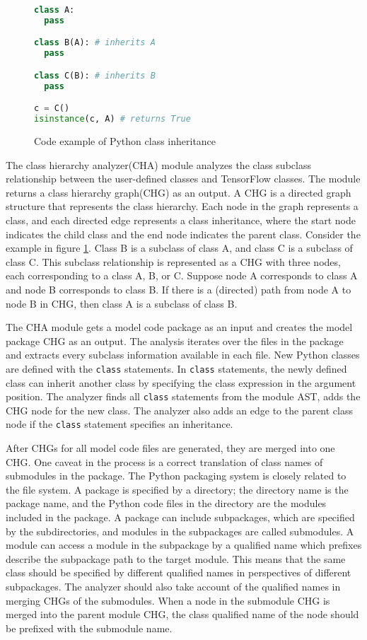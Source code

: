 \begin{figure}[h]
\begin{lstlisting}[language=Python]
class A:
  pass

class B(A): # inherits A
  pass

class C(B): # inherits B
  pass

c = C()
isinstance(c, A) # returns True
\end{lstlisting}
\caption{Code example of Python class inheritance}
\label{fig:cha:pythonex}
\end{figure}

The class hierarchy analyzer(CHA) module analyzes the
class subclass relationship between the 
user-defined classes and TensorFlow classes.
The module returns a class hierarchy graph(CHG) as an output.
A CHG is a directed graph structure that represents the class hierarchy.
Each node in the graph represents a class,
and each directed edge represents a class inheritance,
where the start node indicates the child class
and the end node indicates the parent class.
Consider the example in figure \ref{fig:cha:pythonex}.
Class B is a subclass of class A, and class C is a subclass of 
class C.
This subclass relationship is represented as a CHG with three nodes,
each corresponding to a class A, B, or C.
Suppose node A corresponds to class A and node B corresponds to
class B.
If there is a (directed) path from node A to node B in CHG,
then class A is a subclass of class B.

The CHA module gets a model code package as an input
and creates the model package CHG as an output.
The analysis iterates over the files in the package
and extracts every subclass information available in each file.
New Python classes are defined with the {\tt class} statements.
In {\tt class} statements, the newly defined class can
inherit another class by specifying the class expression
in the argument position.
The analyzer finds all {\tt class} statements from the module AST,
adds the CHG node for the new class. The analyzer also adds an edge
to the parent class node if the {\tt class} statement specifies an inheritance.

After CHGs for all model code files are generated, 
they are merged into one CHG.
One caveat in the process is a correct translation of class names
of submodules in the package.
The Python packaging system is closely related to the file system.
A package is specified by a directory; 
the directory name is the package name, 
and the Python code files in the directory are the modules included in the package.
A package can include subpackages, which are specified
by the subdirectories, and modules in the subpackages are called submodules.
A module can access a module in the subpackage by a qualified name
which prefixes describe the subpackage path to the target module.
This means that the same class should be specified by different qualified
names in perspectives of different subpackages.
The analyzer should also take account of the qualified names
in merging CHGs of the submodules. 
When a node in the submodule CHG is merged into the parent module CHG,
the class qualified name of the node should be prefixed with the
submodule name.

